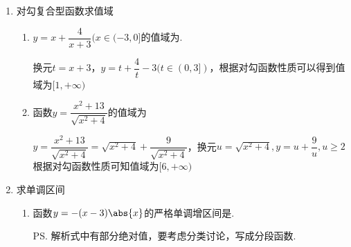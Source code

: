 \begin{enumerate}
\begin{enumerate}
\begin{jieda}
\begin{enumerate}
    \item 当$x>1$时, $y=\sqrt{\dfrac{x^2+1}{x^2-2x+1}}=\sqrt{1+\dfrac{2x}{x^2-2x+1}}=\sqrt{1+\dfrac{2}{x+\dfrac{1}{x}-2}}\in(1,+\infty)$. \\
    当$x<1$时, $y=-\sqrt{\dfrac{x^2+1}{x^2-2x+1}}=-\sqrt{1+\dfrac{2x}{x^2-2x+1}}$. \\
    再分为$(-\infty,0)\cup\{0\}\cup(0,1)$讨论可得$y\in(-\infty,-\dfrac{1}{\sqrt{2}}]$. \\
    综上, $y\in(-\infty,-\dfrac{1}{\sqrt{2}}]\cup(1,+\infty)$.
    \item $y = \sqrt{1+x} - \sqrt{2+x} = \dfrac{(\sqrt{1+x} + \sqrt{2+x})(\sqrt{1+x} - \sqrt{2+x})}{(\sqrt{1+x} + \sqrt{2+x})} = \dfrac{-1}{(\sqrt{1+x} + \sqrt{2+x})}$ \\
    易知函数在定义域$[-1, +\infty)$内单调递增，最小值在左端点$x = -1$取$y = -1$，当$x$趋于无穷时，函数值趋于0。因此值域为$[-1, 0)$
    \item $y = \sqrt{1+x} + \sqrt{2-x}$，故$y^2 = (1+x) + (2-x) + 2\sqrt{(1+x)(2-x)}  = 3 + 2\sqrt{(1+x)(2-x)} \in [3, 6]$，故$y \in [\sqrt{3}, \sqrt{6}]$
    \end{enumerate}
    \end{jieda}
\end{enumerate}
\item 对勾复合型函数求值域
\begin{enumerate}
    \item $y = x + \dfrac{4}{x+3} (x \in (-3, 0]$的值域为\blkda{$[1, +\infty)$}.
    \begin{jieda}
        换元$t = x+3$，$y = t+\dfrac{4}{t}-3 (t \in (0, 3])$，根据对勾函数性质可以得到值域为$[1, +\infty)$
    \end{jieda}
    \item 函数$y = \dfrac{x^2+13}{\sqrt{x^2+4}}$的值域为\blkda{$[6, +\infty)$}
    \begin{jieda}
        $y = \dfrac{x^2+13}{\sqrt{x^2+4}} = \sqrt{x^2+4} + \dfrac{9}{\sqrt{x^2+4}}$，换元$u = \sqrt{x^2+4}, y = u + \dfrac{9}{u}, u \geq 2$根据对勾函数性质可知值域为$[6, +\infty)$
    \end{jieda}
\end{enumerate}
\item 求单调区间
\begin{enumerate}
    \item 函数$y=-(x-3)\abs{x}$的严格单调增区间是. 
    \begin{jieda}
    \ps 解析式中有部分绝对值，要考虑分类讨论，写成分段函数.
    \end{jieda}

\end{enumerate}
\end{enumerate}

